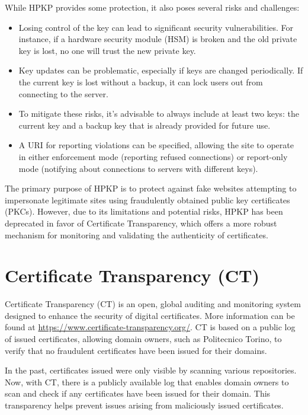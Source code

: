 While HPKP provides some protection, it also poses several risks and
challenges:

\begin{itemize}
  \item Losing control of the key can lead to significant security
    vulnerabilities. For instance, if a hardware security module
    (HSM) is broken and the old private key is lost, no one will
    trust the new private key.
  \item Key updates can be problematic, especially if keys are
    changed periodically. If the current key is lost without a
    backup, it can lock users out from connecting to the server.
  \item To mitigate these risks, it's advisable to always include at
    least two keys: the current key and a backup key that is already
    provided for future use.
  \item A URI for reporting violations can be specified, allowing
    the site to operate in either enforcement mode (reporting
    refused connections) or report-only mode (notifying about
    connections to servers with different keys).
\end{itemize}

The primary purpose of HPKP is to protect against fake websites
attempting to impersonate legitimate sites using fraudulently obtained
public key certificates (PKCs). However, due to its limitations and
potential risks, HPKP has been deprecated in favor of Certificate
Transparency, which offers a more robust mechanism for monitoring and
validating the authenticity of certificates.

\section{Certificate Transparency (CT)}

Certificate Transparency (CT) is an open, global auditing and
monitoring system designed to enhance the security of digital
certificates. More information can be found at
\url{https://www.certificate-transparency.org/}. CT is based on a
public log of issued certificates, allowing domain owners, such as
Politecnico Torino, to verify that no fraudulent certificates have
been issued for their domains.

In the past, certificates issued were only visible by scanning various
repositories. Now, with CT, there is a publicly available log that
enables domain owners to scan and check if any certificates have been
issued for their domain. This transparency helps prevent issues
arising from maliciously issued certificates.

